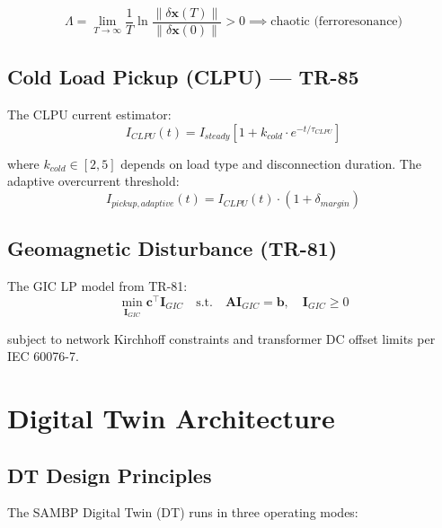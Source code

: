 \documentclass[11pt,a4paper]{report}
\newcommand{\sambp}{\textsc{SAMBP}}
\newcommand{\bvec}[1]{\mathbf{#1}}
\newcommand{\norm}[1]{\left\lVert#1\right\rVert}
\begin{document}
\begin{equation}
\label{eq:lyapunov}
\Lambda = \lim_{T\to\infty}\frac{1}{T}\ln\frac{\norm{\delta\bvec{x}(T)}}{\norm{\delta\bvec{x}(0)}} > 0 \implies \text{chaotic (ferroresonance)}
\end{equation}

\section{Cold Load Pickup (CLPU) — TR-85}

The CLPU current estimator:
\begin{equation}
\label{eq:clpu}
I_{CLPU}(t) = I_{steady}\left[1 + k_{cold}\cdot e^{-t/\tau_{CLPU}}\right]
\end{equation}

where $k_{cold} \in [2, 5]$ depends on load type and disconnection duration. The adaptive overcurrent threshold:
\begin{equation}
I_{pickup,adaptive}(t) = I_{CLPU}(t)\cdot(1 + \delta_{margin})
\end{equation}

\section{Geomagnetic Disturbance (TR-81)}

The GIC LP model from TR-81:
\begin{equation}
\label{eq:gic_lp}
\min_{\bvec{I}_{GIC}} \bvec{c}^\top\bvec{I}_{GIC} \quad \text{s.t.} \quad \bvec{A}\bvec{I}_{GIC} = \bvec{b}, \quad \bvec{I}_{GIC} \geq 0
\end{equation}

subject to network Kirchhoff constraints and transformer DC offset limits per IEC 60076-7.

\chapter{Digital Twin Architecture}
\label{ch:digitaltwin}

\section{DT Design Principles}

The \sambp{} Digital Twin (DT) runs in three operating modes:
\end{document}

